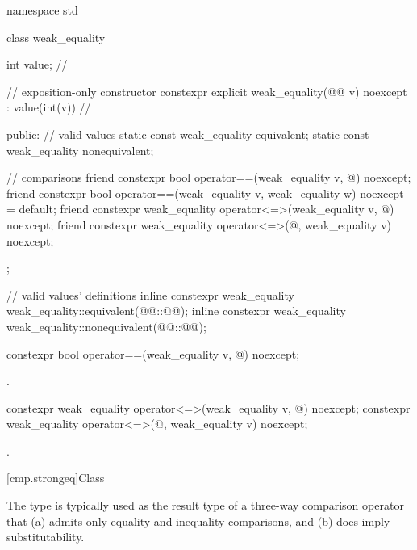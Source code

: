 %
%
%
\begin{codeblock}
namespace std {
  class weak_equality {
    int value;  // \expos

    // exposition-only constructor
    constexpr explicit weak_equality(@@ v) noexcept : value(int(v)) {}  // \expos

  public:
    // valid values
    static const weak_equality equivalent;
    static const weak_equality nonequivalent;

    // comparisons
    friend constexpr bool operator==(weak_equality v, @\unspec@) noexcept;
    friend constexpr bool operator==(weak_equality v, weak_equality w) noexcept = default;
    friend constexpr weak_equality operator<=>(weak_equality v, @\unspec@) noexcept;
    friend constexpr weak_equality operator<=>(@\unspec@, weak_equality v) noexcept;
  };

  // valid values' definitions
  inline constexpr weak_equality weak_equality::equivalent(@@::@@);
  inline constexpr weak_equality weak_equality::nonequivalent(@@::@@);
}
\end{codeblock}

%
\begin{itemdecl}
constexpr bool operator==(weak_equality v, @\unspec@) noexcept;
\end{itemdecl}

\begin{itemdescr}
\pnum
\returns
{}.
\end{itemdescr}

%
\begin{itemdecl}
constexpr weak_equality operator<=>(weak_equality v, @\unspec@) noexcept;
constexpr weak_equality operator<=>(@\unspec@, weak_equality v) noexcept;
\end{itemdecl}

\begin{itemdescr}
\pnum
\returns
{}.
\end{itemdescr}

[cmp.strongeq]{Class }

\pnum
The  type is typically used
as the result type of a three-way comparison operator
that (a) admits only equality and inequality comparisons,
and (b) does imply substitutability.

